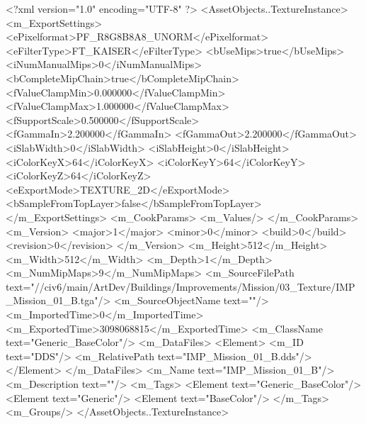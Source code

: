 <?xml version="1.0" encoding="UTF-8" ?>
<AssetObjects..TextureInstance>
	<m_ExportSettings>
		<ePixelformat>PF_R8G8B8A8_UNORM</ePixelformat>
		<eFilterType>FT_KAISER</eFilterType>
		<bUseMips>true</bUseMips>
		<iNumManualMips>0</iNumManualMips>
		<bCompleteMipChain>true</bCompleteMipChain>
		<fValueClampMin>0.000000</fValueClampMin>
		<fValueClampMax>1.000000</fValueClampMax>
		<fSupportScale>0.500000</fSupportScale>
		<fGammaIn>2.200000</fGammaIn>
		<fGammaOut>2.200000</fGammaOut>
		<iSlabWidth>0</iSlabWidth>
		<iSlabHeight>0</iSlabHeight>
		<iColorKeyX>64</iColorKeyX>
		<iColorKeyY>64</iColorKeyY>
		<iColorKeyZ>64</iColorKeyZ>
		<eExportMode>TEXTURE_2D</eExportMode>
		<bSampleFromTopLayer>false</bSampleFromTopLayer>
	</m_ExportSettings>
	<m_CookParams>
		<m_Values/>
	</m_CookParams>
	<m_Version>
		<major>1</major>
		<minor>0</minor>
		<build>0</build>
		<revision>0</revision>
	</m_Version>
	<m_Height>512</m_Height>
	<m_Width>512</m_Width>
	<m_Depth>1</m_Depth>
	<m_NumMipMaps>9</m_NumMipMaps>
	<m_SourceFilePath text="//civ6/main/ArtDev/Buildings/Improvements/Mission/03_Texture/IMP_Mission_01_B.tga"/>
	<m_SourceObjectName text=""/>
	<m_ImportedTime>0</m_ImportedTime>
	<m_ExportedTime>3098068815</m_ExportedTime>
	<m_ClassName text="Generic_BaseColor"/>
	<m_DataFiles>
		<Element>
			<m_ID text="DDS"/>
			<m_RelativePath text="IMP_Mission_01_B.dds"/>
		</Element>
	</m_DataFiles>
	<m_Name text="IMP_Mission_01_B"/>
	<m_Description text=""/>
	<m_Tags>
		<Element text="Generic_BaseColor"/>
		<Element text="Generic"/>
		<Element text="BaseColor"/>
	</m_Tags>
	<m_Groups/>
</AssetObjects..TextureInstance>

